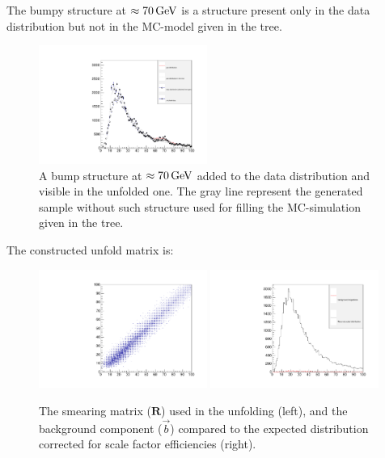 \documentclass[a4paper,11pt]{article}
\begin{document}
The bumpy structure at $\approx70\,\textup{GeV}$ is a structure present only in the data distribution but not in the \gls{MC}-model given in the tree.
\begin{figure}[H]
	\centering
	\includegraphics[width=0.49\textwidth]{figs2/bump.pdf}
	\caption{ \label{fig:sol:bump} A bump structure at $\approx 70\,\textup{GeV}$ added to the data distribution and visible in the unfolded one. The gray line represent the generated sample without such structure used for filling the \gls{MC}-simulation given in the tree.
	}
\end{figure}

The constructed unfold matrix is:
\begin{figure}[H]
	\centering
	\includegraphics[width=0.49\textwidth]{figs2/matrix.pdf}
	\includegraphics[width=0.49\textwidth]{figs2/bkg.pdf}
	\caption{The smearing matrix ($\mathbf{R}$) used in the unfolding (left), and the background component ($\vec{b}$) compared to the expected distribution corrected for scale factor efficiencies (right).
	}
\end{figure}
\end{document}
